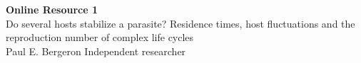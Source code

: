 \documentclass[11pt]{article}
\theoremstyle{plain}
\theoremstyle{remark}
\theoremstyle{definition}
\begin{document}
\begin{center}
{\Large\bfseries Online Resource 1}\\[4pt]
{\large Do several hosts stabilize a parasite? Residence times, host fluctuations and the reproduction number of complex life cycles}\\[6pt]
Paul E. Bergeron \quad Independent researcher
\end{center}

\tableofcontents



\end{document}
